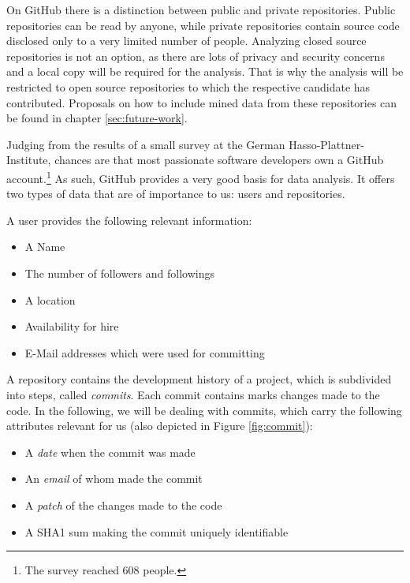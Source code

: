 On GitHub there is a distinction between public and private repositories. Public repositories can be read by anyone, while private repositories contain source code disclosed only to a very limited number of people. Analyzing closed source repositories is not an option, as there are lots of privacy and security concerns and a local copy will be required for the analysis. That is why the analysis will be restricted to open source repositories to which the respective candidate has contributed. Proposals on how to include mined data from these repositories can be found in chapter \ref{sec:future-work}.
\newline


Judging from the results of a small survey at the German Hasso-Plattner-Institute, chances are that most passionate software developers own a GitHub account.\footnote{The survey reached 608 people.}
As such, GitHub provides a very good basis for data analysis. It offers two types of data that are of importance to us: users and repositories.
\newline

A user provides the following relevant information:
\begin{itemize}
  \item A Name
  \item The number of followers and followings
  \item A location
  \item Availability for hire
  \item E-Mail addresses which were used for committing
\end{itemize}
\vspace{1em}

\noindent A repository contains the development history of a project, which is subdivided into steps, called \textit{commits}. Each commit contains marks changes made to the code. In the following, we will be dealing with commits, which carry the following attributes relevant for us (also depicted in Figure \ref{fig:commit}):

\begin{itemize}
    \item A \textit{date} when the commit was made
    \item An \textit{email} of whom made the commit
    \item A \textit{patch} of the changes made to the code
    \item A SHA1 sum making the commit uniquely identifiable
\end{itemize}

